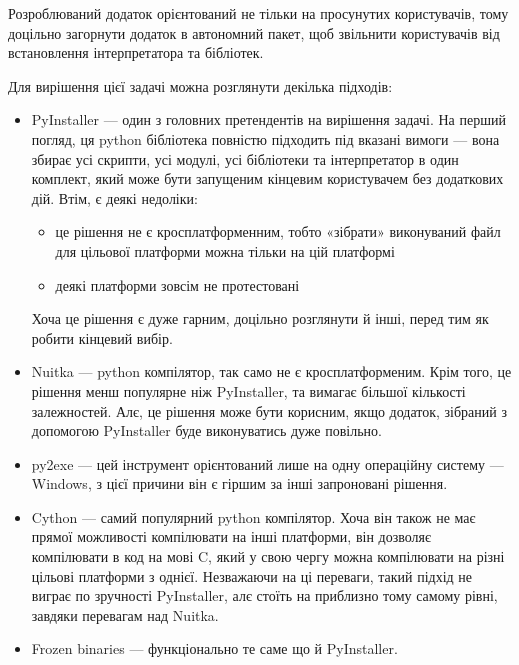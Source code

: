 \documentclass[14pt]{extarticle}
\begin{document}
  Розроблюваний додаток орієнтований не тільки на просунутих користувачів,
  тому доцільно загорнути додаток в автономний пакет,
  щоб звільнити користувачів від встановлення інтерпретатора та бібліотек.

  Для вирішення цієї задачі можна розглянути декілька підходів:
  \begin{itemize}[labelindent=\dimexpr{}\relax, leftmargin=*]
    \item PyInstaller \cite{pyinstaller} ---
      один з головних претендентів на вирішення задачі.
      На перший погляд,
      ця python бібліотека повністю підходить під вказані вимоги ---
      вона збирає усі скрипти, усі модулі,
      усі бібліотеки та інтерпретатор в один комплект,
      який може бути запущеним кінцевим користувачем без додаткових дій.
      Втім, є деякі недоліки:
      \begin{itemize}
        \item це рішення не є кросплатформенним, тобто «зібрати» виконуваний файл для цільової платформи можна тільки на цій платформі
        \item деякі платформи зовсім не протестовані
      \end{itemize}
      Хоча це рішення є дуже гарним, доцільно розглянути й інші,
      перед тим як робити кінцевий вибір.
    
    \item Nuitka \cite{nuitka} --- python компілятор,
      так само не є кросплатформеним.
      Крім того, це рішення менш популярне ніж PyInstaller,
      та вимагає більшої кількості залежностей.
      Алє, це рішення може бути корисним, якщо додаток,
      зібраний з допомогою PyInstaller буде виконуватись дуже повільно.

    \item py2exe \cite{py2exe} --- цей інструмент орієнтований лише на одну
      операційну систему --- Windows,
      з цієї причини він є гіршим за інші запроновані рішення.
    
    \item Cython \cite{cython} --- самий популярний python компілятор.
    Хоча він також не має прямої можливості компілювати на інші платформи,
    він дозволяє компілювати в код на мові C,
    який у свою чергу можна компілювати на різні цільові платформи з однієї.
    Незважаючи на ці переваги, такий підхід не виграє по зручності PyInstaller,
    алє стоїть на приблизно тому самому рівні, завдяки перевагам над Nuitka.
    
    \item Frozen binaries \cite{github_cpython_freeze} ---
      функціонально те саме що й PyInstaller.
    

\end{itemize}
\end{document}
